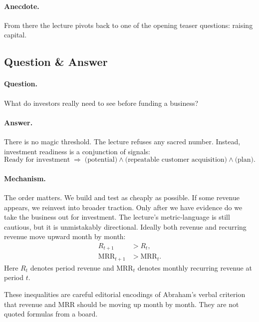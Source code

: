 \paragraph{Anecdote.} From there the lecture pivots back to one of the opening teaser questions: raising capital.

\subsection{Question \& Answer}

\paragraph{Question.} What do investors really need to see before funding a business?

\paragraph{Answer.} There is no magic threshold. The lecture refuses any sacred number. Instead, investment readiness is a conjunction of signals:
\begin{equation}
\text{Ready for investment}
\;\Rightarrow\;
\bigl(\text{potential}\bigr)
\land
\bigl(\text{repeatable customer acquisition}\bigr)
\land
\bigl(\text{plan}\bigr).
\end{equation}

\paragraph{Mechanism.} The order matters. We build and test as cheaply as possible. If some revenue appears, we reinvest into broader traction. Only after we have evidence do we take the business out for investment. The lecture's metric-language is still cautious, but it is unmistakably directional. Ideally both revenue and recurring revenue move upward month by month:
\begin{align}
R_{t+1} &> R_t,\\
\mathrm{MRR}_{t+1} &> \mathrm{MRR}_t.
\end{align}
Here \(R_t\) denotes period revenue and \(\mathrm{MRR}_t\) denotes monthly recurring revenue at period \(t\).

\begin{remark}
These inequalities are careful editorial encodings of Abraham's verbal criterion that revenue and \(\mathrm{MRR}\) should be moving up month by month. They are not quoted formulas from a board.
\end{remark}


